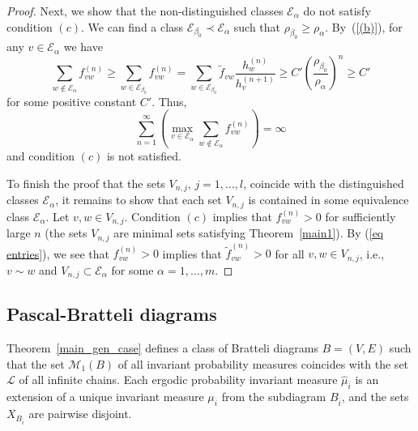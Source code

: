\documentclass[11pt, english, reqno]{amsart}
\theoremstyle{definition}
\theoremstyle{remark}
\theoremstyle{plain}
\def\ov{\overline}
\def\tl{\widetilde}
\def\wh{\widehat}
\numberwithin{equation}{section}
\begin{document}
{\begin{proof}
Next, we show that the non-distinguished classes $\mathcal{E}_{\alpha}$ do
not satisfy condition $(c)$. We can find a class $\mathcal{E}_{\beta_0}
\prec \mathcal{E}_{\alpha}$ such that $\rho_{\beta_0} \geq
\rho_{\alpha}$. By~(\ref{(b)}), for any $v \in \mathcal{E}_{\alpha}$ we
have
$$
\sum_{w \notin \mathcal{E}_{\alpha}} f_{vw}^{(n)} \geq \sum_{w \in
\mathcal{E}_{\beta_0}}  f_{vw}^{(n)} = \sum_{w \in
\mathcal{E}_{\beta_0}}  \tl f_{vw}\frac{h_w^{(n)}}{h_{v}^{(n+1)}} \geq
C' \left(\frac{\rho_{\beta_0}}{\rho_{\alpha}}\right)^n \geq C'
$$
for some positive constant $C'$.
Thus,
$$
\sum_{n = 1}^{\infty}\left(\max_{v \in \mathcal{E}_{\alpha}}\sum_{w
\notin \mathcal{E}_{\alpha}}f_{vw}^{(n)}\right) = \infty
$$
and condition $(c)$ is not satisfied.

To finish the proof that the sets $V_{n,j}$, $j = 1,\ldots,l$, coincide with the
distinguished classes $\mathcal{E}_{\alpha}$, it remains to show that each
set $V_{n,j}$ is contained in some equivalence class
$\mathcal{E}_{\alpha}$. Let $v,w \in V_{n,j}$. Condition $(c)$ implies that
$f_{vw}^{(n)} > 0$ for sufficiently large $n$ (the sets $V_{n,j}$ are
minimal sets satisfying Theorem~\ref{main1}). By (\ref{eq entries}),
we see that $f_{vw}^{(n)} > 0$ implies that $\tl f_{vw}^{(n)} > 0$
 for all $v,w \in V_{n,j}$, i.e., $v \sim w$ and
$V_{n,j} \subset \mathcal{E}_{\alpha}$ for some $\alpha = 1,\ldots,m$.
\end{proof}


\subsection{Pascal-Bratteli diagrams}

Theorem~\ref{main_gen_case} defines a class of Bratteli diagrams $B =
(V,E)$ such that the set $\mathcal{M}_1(B)$ of all invariant probability
measures coincides with the set $\mathcal{L}$ of all infinite chains. Each
ergodic probability invariant measure $\wh{\mu}_{\ov i}$ is an extension of
a unique invariant measure $\mu_{\ov i}$ from the subdiagram $B_{\ov i}$,
and the sets $X_{B_{\ov i}}$ are pairwise disjoint.

}
\end{document}

